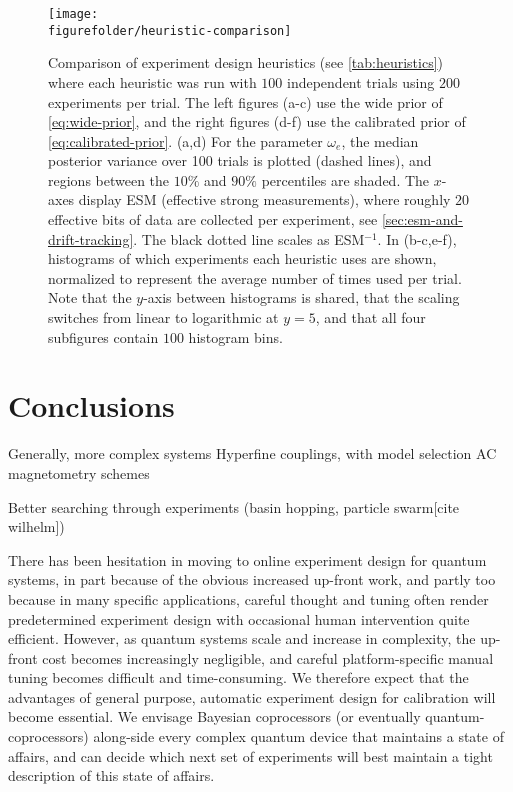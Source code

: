 \documentclass[aps,nofootinbib,twocolumn,superscriptaddress]{revtex4}
\newcommand{\figurefolder}{../fig}
\begin{document}
\begin{figure*}
    \centering
    \texttt{[image: \\figurefolder/heuristic-comparison]}
    \caption{Comparison of experiment design heuristics 
    (see \autoref{tab:heuristics}) where each heuristic was run
    with $100$ independent trials using $200$ experiments per trial.
    The left figures (a-c) use the wide prior of \autoref{eq:wide-prior}, 
    and the right figures (d-f) use the calibrated prior of 
    \autoref{eq:calibrated-prior}.
    (a,d) For the parameter $\omega_e$, the median posterior variance 
    over 100 trials is plotted (dashed lines), and 
    regions between the $10\%$ and $90\%$ percentiles are shaded.
    The $x$-axes display ESM (effective strong measurements), where
    roughly $20$ effective bits of data are collected per experiment,
    see \autoref{sec:esm-and-drift-tracking}.
    The black dotted line scales as ESM$^{-1}$.
    In (b-c,e-f), histograms of which experiments each heuristic uses are 
    shown, normalized to represent the average number of times 
    used per trial.
    Note that the $y$-axis between histograms is shared, that 
    the scaling switches from linear to logarithmic at $y=5$, and 
    that all four subfigures contain $100$ histogram bins.
    }
    \label{fig:heuristic-comparison}
\end{figure*}

\section{Conclusions}
\label{sec:conclusions}


Generally, more complex systems
Hyperfine couplings, with model selection
AC magnetometry schemes

Better searching through experiments (basin hopping, particle swarm[cite wilhelm])

There has been hesitation in moving to online experiment design for 
quantum systems, in part because of the obvious increased up-front work,
and partly too because in many specific applications, careful 
thought and tuning 
often render predetermined experiment design with occasional 
human intervention quite efficient.
However, as quantum systems scale and increase in complexity, the 
up-front cost becomes increasingly negligible, and careful
platform-specific manual tuning becomes difficult and time-consuming.
We therefore expect 
that the advantages of general purpose, automatic experiment design for calibration will become essential.
We envisage Bayesian coprocessors (or eventually quantum-coprocessors) 
along-side every complex quantum device that maintains a state of affairs,
and can decide which next set of experiments will best maintain a tight
description of this state of affairs.
\end{document}
